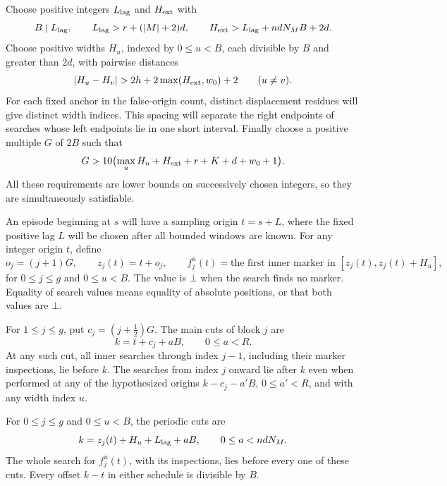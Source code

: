 Choose positive integers $L_{\rm lag}$ and $H_{\rm ext}$ with
\begin{equation}\label{schedule:lag}
 B\mid L_{\rm lag},\qquad
 L_{\rm lag}>r+(|M|+2)d,\qquad
 H_{\rm ext}>L_{\rm lag}+ndN_MB+2d.
\end{equation}
Choose positive widths $H_u$, indexed by $0\le u<B$, each divisible by
$B$ and greater than $2d$, with pairwise distances
\begin{equation}\label{schedule:width-spacing}
 |H_u-H_v|>2h+2\max(H_{\rm ext},w_0)+2
 \qquad(u\ne v).
\end{equation}
For each fixed anchor in the false-origin count, distinct displacement
residues will give distinct width indices. This spacing will separate the
right endpoints of searches whose left endpoints lie in one short interval.
Finally choose a positive multiple $G$ of $2B$ such that
\begin{equation}\label{schedule:block-spacing}
 G>10\bigl(\max_u H_u+H_{\rm ext}+r+K+d+w_0+1\bigr).
\end{equation}
All these requirements are lower bounds on successively chosen integers,
so they are simultaneously satisfiable.

An episode beginning at $s$ will have a sampling origin $t=s+L$, where the
fixed positive lag $L$ will be chosen after all bounded windows are known.
For any integer origin $t$, define
\begin{equation}\label{schedule:inner-searches}
 o_j=(j+1)G,\qquad z_j(t)=t+o_j,\qquad
 f_j^u(t)=\text{the first inner marker in }[z_j(t),z_j(t)+H_u],
\end{equation}
for $0\le j\le g$ and $0\le u<B$.  The value is $\bot$ when the search
finds no marker.  Equality of search values means equality of absolute
positions, or that both values are $\bot$.

\begin{lemma}\label{schedule:inner-cuts}
For $1\le j\le g$, put $c_j=(j+\tfrac12)G$.  The main cuts of block $j$
are
\begin{equation}\label{schedule:main-cuts}
 k=t+c_j+aB,\qquad 0\le a<R.
\end{equation}
At any such cut, all inner searches through index $j-1$, including their
marker inspections, lie before $k$.  The searches from index $j$ onward
lie after $k$ even when performed at any of the hypothesized origins
$k-c_j-a'B$, $0\le a'<R$, and with any width index $u$.

For $0\le j\le g$ and $0\le u<B$, the periodic cuts are
\begin{equation}\label{schedule:periodic-cut-formula}
 k=z_j(t)+H_u+L_{\rm lag}+aB,
 \qquad 0\le a<ndN_M.
\end{equation}
The whole search for $f_j^u(t)$, with its inspections, lies before every
one of these cuts.  Every offset $k-t$ in either schedule is divisible
by $B$.
\end{lemma}

